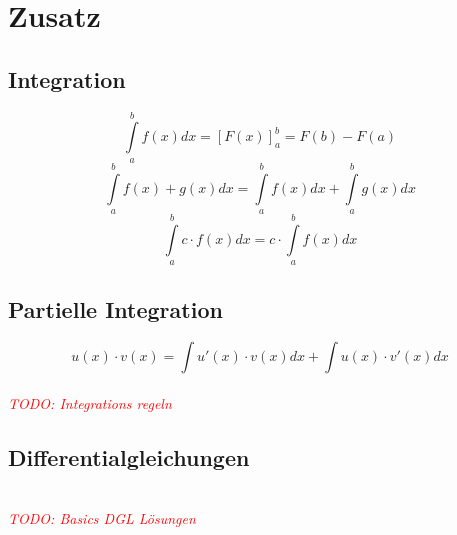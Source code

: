 \documentclass[12pt]{article}
\newcommand\todo[1]{\textit{\textcolor{red}{\\TODO: #1}}}
\begin{document}
\section{Zusatz}
\subsection{Integration}
\begin{equation*}
	\int\limits_{a}^{b}f(x) dx = [F(x)]_a^b = F(b) - F(a)
\end{equation*}
\begin{equation*}
	\int\limits_{a}^{b}f(x) + g(x) dx = \int\limits_{a}^{b}f(x) dx + \int\limits_{a}^{b}g(x) dx
\end{equation*}
\begin{equation*}
	\int\limits_{a}^{b}c\cdot f(x) dx = c\cdot \int\limits_{a}^{b}f(x) dx
\end{equation*}
\subsection{Partielle Integration}
\begin{equation*}
	u(x)\cdot v(x) = \int u'(x) \cdot v(x) dx + \int u(x) \cdot v'(x) dx
\end{equation*}
\todo{Integrations regeln}
\subsection{Differentialgleichungen}
\todo{Basics DGL Lösungen}
\newpage
\end{document}
